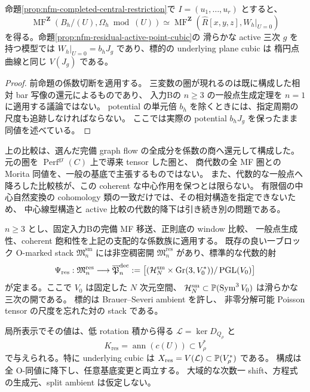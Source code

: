 \begin{corollary}
\label{cor:nfm-completed-active-mf}
命題\ref{prop:nfm-completed-central-restriction}で
$I=(u_1,\ldots,u_r)$ とすると、
\[
 \operatorname{MF}^{\mathbf Z}
       (B_h/(U),\Omega_h\bmod(U))
 \simeq
 \operatorname{MF}^{\mathbf Z}
       (\widehat R[x,y,z],W_h|_{U=0})
\]
を得る。命題\ref{prop:nfm-residual-active-point-cubic}の
滑らかな active 三次 $g$ を持つ模型では
$W_h|_{U=0}=b_hJ_g$ であり、標的の underlying plane cubic は
楕円点曲線と同じ $V(J_g)$ である。
\end{corollary}

\begin{proof}
前命題の係数切断を適用する。
三変数の圏が現れるのは既に構成した相対 bar 写像の還元によるものであり、
入力Bの $n\ge3$ の一般点生成定理を $n=1$ に適用する議論ではない。
potential の単元倍 $b_h$ を除くときには、指定周期の尺度も追跡しなければならない。
ここでは実際の potential $b_hJ_g$ を保ったまま同値を述べている。
\end{proof}

\begin{remark}
\label{rem:nfm-central-restriction-scope}
上の比較は、選んだ完備 graph flow の全成分を係数の商へ還元して構成した。
元の圏を $\operatorname{Perf}^{\mathrm{gr}}(C)$ 上で導来 tensor した圏と、
商代数の全 MF 圏との Morita 同値を、一般の基底で主張するものではない。
また、代数的な一般点へ降ろした比較核が、この coherent な中心作用を保つとは限らない。
有限個の中心自然変換の cohomology 類の一致だけでは、その相対構造を指定できないため、
中心線型構造と active 比較の代数的降下は引き続き別の問題である。
\end{remark}


\begin{theorem}
\label{thm:nfm-projective-residual-morphism}
$n\ge3$ とし、固定入力Bの完備 MF 移送、正則底の window 比較、
一般点生成性、coherent 飽和性を上記の支配的な係数族に適用する。
既存の良い一ブロック O-marked stack
$\mathfrak M_n^{\mathrm{sm}}$ には非空稠密開
$\mathfrak M_n^{\mathrm{res}}$ があり、標準的な代数的射
\begin{equation}
\label{eq:nfm-projective-residual-map}
 \Psi_{\mathrm{res}}:
 \mathfrak M_n^{\mathrm{res}}\longrightarrow
 \overline{\mathfrak P}_n^{\mathrm{dec}}
 :=
 \bigl[(\mathcal H_N^{\mathrm{sm}}\times
              \operatorname{Gr}(3,V_0^*))/\operatorname{PGL}(V_0)\bigr]
\end{equation}
が定まる。ここで $V_0$ は固定した $N$ 次元空間、
$\mathcal H_N^{\mathrm{sm}}\subset\mathbb P(\operatorname{Sym}^3V_0)$ は滑らかな三次の開である。
標的は Brauer--Severi ambient を許し、
非零分解可能 Poisson tensor の尺度を忘れた対の stack である。

局所表示でその値は、低 rotation 積から得る
$\mathcal L=\ker D_{Q_\rho}$ と
\[
 K_{\mathrm{res}}=\operatorname{ann}(c(U))\subset V_\rho^*
\]
で与えられる。特に underlying cubic は
$X_{\mathrm{res}}=V(\mathcal L)\subset\mathbb P(V_\rho^*)$ である。
構成は全 O-同値に降下し、任意基底変更と両立する。
大域的な次数一 shift、方程式の生成元、split ambient は仮定しない。
\end{theorem}


